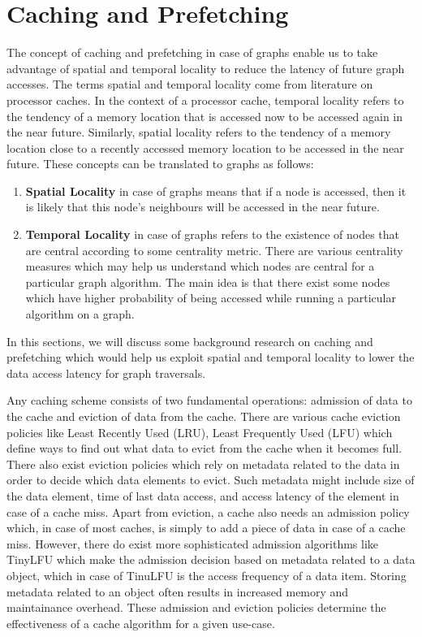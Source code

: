 \section{Caching and Prefetching}\label{sec:cachingDistSys}
The concept of caching and prefetching in case of graphs enable us to take
advantage of spatial and temporal locality to reduce the latency of future graph
accesses. The terms spatial and temporal locality come from literature on
processor caches. In the context of a processor cache, temporal locality refers
to the tendency of a memory location that is accessed now to be
accessed again in the near future. Similarly, spatial locality refers to the 
tendency of a memory location close to a recently accessed memory location to be
accessed in the near future. These concepts can be translated to graphs as
follows:
\begin{enumerate}
    \item \textbf{Spatial Locality} in case of graphs means that if a node is
        accessed, then it is likely that this node's neighbours will be accessed
        in the near future.
    \item \textbf{Temporal Locality} in case of graphs refers to the existence
        of nodes that are central according to some centrality metric. There are
        various centrality measures\cite{klein2010centrality} which may help us 
        understand which nodes are central for a particular graph algorithm. The
        main idea is that there exist some nodes which have higher probability
        of being accessed while running a particular algorithm on a graph.
\end{enumerate}
In this sections, we will discuss some background research on caching and
prefetching which would help us exploit  spatial and temporal locality to lower
the data access latency for graph traversals.

\medskip
Any caching scheme consists of two fundamental operations: admission of
data to the cache and eviction of data from the cache. There are various cache
eviction policies like Least Recently Used (LRU), Least Frequently Used (LFU)
which define ways to find out what data to evict from the cache when it becomes
full. There also exist eviction policies which rely on metadata related to the
data in order to decide which data elements to evict. Such metadata might
include size of the data element, time of last data access, and access latency
of the element in case of a cache miss. Apart from eviction, a cache also needs
an admission policy which, in case of most caches, is simply to add a piece of
data in case of a cache miss. However, there do exist more sophisticated
admission algorithms like TinyLFU\cite{einziger2017tinylfu} which make the
admission decision based on metadata related to a data object, which in case of
TinuLFU is the access frequency of a data item. Storing metadata related to an
object often results in increased memory and maintainance overhead. These
admission and eviction policies determine the effectiveness of a cache algorithm
for a given use-case.

